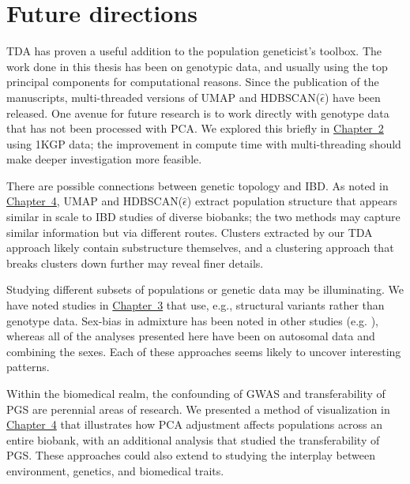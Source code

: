 \section{Future directions}

TDA has proven a useful addition to the population geneticist's toolbox. The work done in this thesis has been on genotypic data, and usually using the top principal components for computational reasons. Since the publication of the manuscripts, multi-threaded versions of UMAP and HDBSCAN($\hat{\epsilon}$) have been released. One avenue for future research is to work directly with genotype data that has not been processed with PCA. We explored this briefly in \hyperref[chap:chapter1]{Chapter~2} using 1KGP data; the improvement in compute time with multi-threading should make deeper investigation more feasible.

There are possible connections between genetic topology and IBD. As noted in \hyperref[chap:chapter3]{Chapter~4}, UMAP and HDBSCAN($\hat{\epsilon}$) extract population structure that appears similar in scale to IBD studies of diverse biobanks; the two methods may capture similar information but via different routes. Clusters extracted by our TDA approach likely contain substructure themselves, and a clustering approach that breaks clusters down further may reveal finer details.

Studying different subsets of populations or genetic data may be illuminating. We have noted studies in \hyperref[chap:chapter2]{Chapter~3} that use, e.g., structural variants rather than genotype data. Sex-bias in admixture has been noted in other studies (e.g. \citep{ongaro_evaluating_2021,korunes_sex-biased_2022,marcheco-teruel_cuba_2014}), whereas all of the analyses presented here have been on autosomal data and combining the sexes. Each of these approaches seems likely to uncover interesting patterns.

Within the biomedical realm, the confounding of GWAS and transferability of PGS are perennial areas of research. We presented a method of visualization in \hyperref[chap:chapter3]{Chapter~4} that illustrates how PCA adjustment affects populations across an entire biobank, with an additional analysis that studied the transferability of PGS. These approaches could also extend to studying the interplay between environment, genetics, and biomedical traits.

